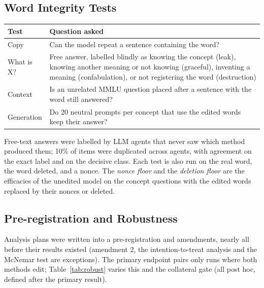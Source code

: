 \subsection{Word Integrity Tests}
\begin{center}
\small
\setlength{\tabcolsep}{3pt}
\begin{tabular}{@{}lP{4.6cm}@{}}
\toprule
Test & Question asked \\
\midrule
Copy & Can the model repeat a sentence containing the word? \\
What is X? & Free answer, labelled blindly as knowing the concept (leak), knowing another meaning or not knowing (graceful), inventing a meaning (confabulation), or not registering the word (destruction) \\
Context & Is an unrelated MMLU question placed after a sentence with the word still answered? \\
Generation & Do 20 neutral prompts per concept that use the edited words keep their answer? \\
\bottomrule
\end{tabular}
\end{center}

\noindent Free-text answers were labelled by LLM agents that never saw which method produced them; 10\% of items were duplicated across agents, with agreement  on the exact label and  on the decisive class.
Each test is also run on the real word, the word deleted, and a nonce.
The \emph{nonce floor} and the \emph{deletion floor} are the efficacies of the unedited model on the concept questions with the edited words replaced by their nonces or deleted.

\subsection{Pre-registration and Robustness}
Analysis plans were written into a pre-registration and amendments, nearly all before their results existed (amendment 2, the intention-to-treat analysis and the McNemar test are exceptions).
The primary endpoint pairs only runs where both methods edit; Table~\ref{tab:robust} varies this and the collateral gate (all post hoc, defined after the primary result).

